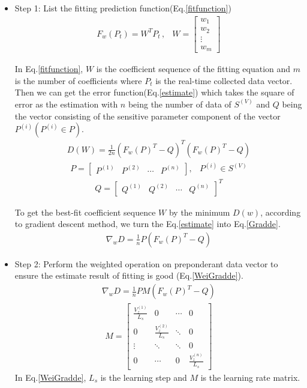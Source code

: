 \begin{itemize}
	\item Step 1: List the fitting prediction function(Eq.\ref{fitfunction})
	\begin{eqnarray}\label{fitfunction}
	F_{w}(P_{t})=W^{T}P_{t}\,,&W=\begin{bmatrix}w_{1}\\ w_{2}\\ \vdots \\ w_{m}\end{bmatrix}
	\end{eqnarray}
	
	In Eq.\ref{fitfunction}, $W$ is the coefficient sequence of the fitting equation and $m$ is the number of coefficients where $P_{t}$ is the real-time collected data vector. Then we can get the error function(Eq.\ref{estimate}) which takes the square of error as the estimation with $n$ being the number of data of $S^{(V)}$ and $Q$ being the vector consisting of the sensitive parameter component of the vector $P^{(i)}( P^{(i)} \in P)$.
	\begin{eqnarray}\label{estimate}
		D(W)=\frac{1}{2n}(F_{w}(P)^{T}-Q)^{T}(F_{w}(P)^{T}-Q)
	\end{eqnarray}
	\begin{eqnarray}
		P=\begin{bmatrix}P^{(1)}&P^{(2)}  &\cdots  &P^{(n)} \end{bmatrix}, &P^{(i)}\in S^{(V)}
	\end{eqnarray}
	\begin{eqnarray}
		Q=\begin{bmatrix}Q^{(1)}& Q^{(2)}& \cdots & Q^{(n)}\end{bmatrix}^{T}
	\end{eqnarray}
	
	To get the best-fit coefficient sequence $W$ by the minimum $D(w)$, according to gradient descent method, we turn the Eq.\ref{estimate} into Eq.\ref{Gradde}.
	\begin{eqnarray}\label{Gradde}
	\nabla_{w}D=\frac{1}{n}P(F_{w}(P)^{T}-Q)
	\end{eqnarray}
	
	\item Step 2: Perform the weighted operation on preponderant data vector to ensure the estimate result of fitting is good (Eq.\ref{WeiGradde}).
	\begin{eqnarray}
	\nabla_{w}D=\frac{1}{n}PM(F_{w}(P)^{T}-Q)
	\end{eqnarray}
	\begin{eqnarray}\label{WeiGradde}
	M=\begin{bmatrix}
	\frac{V_{z}^{(1)}}{L_{s}}&0&\cdots&0\\
	0&\frac{V_{z}^{(2)}}{L_{s}}&\ddots&0\\
	\vdots&\ddots&\ddots&0\\
	0&\cdots&0&\frac{V_{z}^{(n)}}{L_{s}}
	\end{bmatrix}
	\end{eqnarray}
	In Eq.\ref{WeiGradde}, $L_s$ is the learning step and $M$ is the learning rate matrix.
	

\end{itemize}
